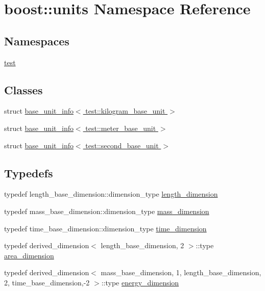 \hypertarget{namespaceboost_1_1units}{}\section{boost\+:\+:units Namespace Reference}
\label{namespaceboost_1_1units}
\subsection*{Namespaces}
\begin{DoxyCompactItemize}
\item 
 \hyperlink{namespaceboost_1_1units_1_1test}{test}
\end{DoxyCompactItemize}
\subsection*{Classes}
\begin{DoxyCompactItemize}
\item 
struct \hyperlink{structboost_1_1units_1_1base__unit__info_3_01test_1_1kilogram__base__unit_01_4}{base\+\_\+unit\+\_\+info$<$ test\+::kilogram\+\_\+base\+\_\+unit $>$}
\item 
struct \hyperlink{structboost_1_1units_1_1base__unit__info_3_01test_1_1meter__base__unit_01_4}{base\+\_\+unit\+\_\+info$<$ test\+::meter\+\_\+base\+\_\+unit $>$}
\item 
struct \hyperlink{structboost_1_1units_1_1base__unit__info_3_01test_1_1second__base__unit_01_4}{base\+\_\+unit\+\_\+info$<$ test\+::second\+\_\+base\+\_\+unit $>$}
\end{DoxyCompactItemize}
\subsection*{Typedefs}
\begin{DoxyCompactItemize}
\item 
typedef length\+\_\+base\+\_\+dimension\+::dimension\+\_\+type \hyperlink{namespaceboost_1_1units_ae50eae7dfa312b039ce7aac232ac27c4}{length\+\_\+dimension}
\item 
typedef mass\+\_\+base\+\_\+dimension\+::dimension\+\_\+type \hyperlink{namespaceboost_1_1units_a5baec398fcf78171420ff24e743f1faa}{mass\+\_\+dimension}
\item 
typedef time\+\_\+base\+\_\+dimension\+::dimension\+\_\+type \hyperlink{namespaceboost_1_1units_a8fc0b5bca117a7c220c018021ebe821f}{time\+\_\+dimension}
\item 
typedef derived\+\_\+dimension$<$ length\+\_\+base\+\_\+dimension, 2 $>$\+::type \hyperlink{namespaceboost_1_1units_aaa72083d461d56b8a6163423691c2c6a}{area\+\_\+dimension}
\item 
typedef derived\+\_\+dimension$<$ mass\+\_\+base\+\_\+dimension, 1, length\+\_\+base\+\_\+dimension, 2, time\+\_\+base\+\_\+dimension,-\/2 $>$\+::type \hyperlink{namespaceboost_1_1units_a6925a7132e69383f3bcf68b27cdb9475}{energy\+\_\+dimension}
\end{DoxyCompactItemize}


